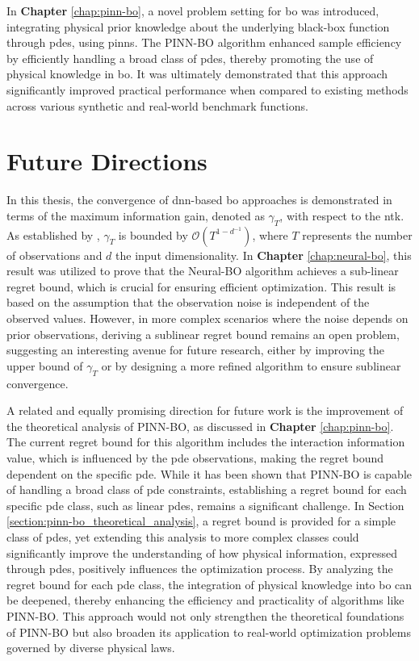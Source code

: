 In \textbf{Chapter} \ref{chap:pinn-bo}, a novel problem setting for \ac{bo} was introduced, integrating physical prior knowledge about the underlying black-box function through \acp{pde}, using \acp{pinn}. The PINN-BO algorithm enhanced sample efficiency by efficiently handling a broad class of \acp{pde}, thereby promoting the use of physical knowledge in \ac{bo}. It was ultimately demonstrated that this approach significantly improved practical performance when compared to existing methods across various synthetic and real-world benchmark functions.
 
\section{Future Directions}
In this thesis, the convergence of \ac{dnn}-based \ac{bo} approaches is demonstrated in terms of the maximum information gain, denoted as $\gamma_T$, with respect to the \ac{ntk}. As established by \citet{kassraie2022neural}, $\gamma_T$ is bounded by $\mathcal{O}(T^{1-d^{-1}})$, where $T$ represents the number of observations and $d$ the input dimensionality. In \textbf{Chapter} \ref{chap:neural-bo}, this result was utilized to prove that the Neural-BO algorithm achieves a sub-linear regret bound, which is crucial for ensuring efficient optimization. This result is based on the assumption that the observation noise is independent of the observed values. However, in more complex scenarios where the noise depends on prior observations, deriving a sublinear regret bound remains an open problem, suggesting an interesting avenue for future research, either by improving the upper bound of $\gamma_T$ or by designing a more refined algorithm to ensure sublinear convergence.

A related and equally promising direction for future work is the improvement of the theoretical analysis of PINN-BO, as discussed in \textbf{Chapter} \ref{chap:pinn-bo}. The current regret bound for this algorithm includes the interaction information value, which is influenced by the \ac{pde} observations, making the regret bound dependent on the specific \ac{pde}. While it has been shown that PINN-BO is capable of handling a broad class of \ac{pde} constraints, establishing a regret bound for each specific \ac{pde} class, such as linear \acp{pde}, remains a significant challenge. In Section \ref{section:pinn-bo_theoretical_analysis}, a regret bound is provided for a simple class of \acp{pde}, yet extending this analysis to more complex classes could significantly improve the understanding of how physical information, expressed through \acp{pde}, positively influences the optimization process. By analyzing the regret bound for each \ac{pde} class, the integration of physical knowledge into \acl{bo} can be deepened, thereby enhancing the efficiency and practicality of algorithms like PINN-BO. This approach would not only strengthen the theoretical foundations of PINN-BO but also broaden its application to real-world optimization problems governed by diverse physical laws.      
